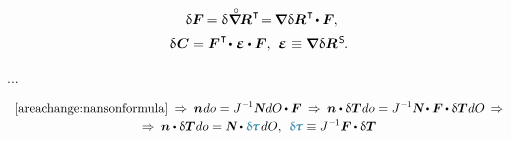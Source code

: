 \begin{otherlanguage}{russian}
\begin{equation}
\begin{array}{c}
\:\,
\variation{\bm{F}} \hspace{-0.2ex} = \variation{\hspace{.1ex} \boldnablacircled \hspace{-0.16ex} \bm{R}^{\hspace{0.12ex}\T}} \hspace{-0.4ex}
= \hspace{-0.2ex} \boldnabla \hspace{.1ex} \variation{\bm{R}}^{\hspace{0.12ex}\T} \hspace{-0.25ex} \dotp \bm{F}
\hspace{-0.1ex} ,
\\[.5em]
%
\variation{\hspace{.12ex}\bm{C}} = \bm{F}^{\hspace{.1ex}\T} \hspace{-0.32ex} \dotp \hspace{.1ex} \mathboldepsilon \dotp \bm{F} ,
\:\,
\mathboldepsilon \hspace{0.1ex} \equiv \boldnabla \hspace{.1ex} \variation{\bm{R}}^{\hspace{0.2ex}\mathsf{S}} \hspace{-0.2ex} .
\end{array}
\end{equation}

...

\begin{equation*}\begin{array}{c}
\eqref{areachange:nansonformula}
\:\Rightarrow\:
%
\bm{n} \hspace{.1ex} do = J^{\hspace{.12ex}\expminusone} \mathboldN \hspace{.1ex} dO \hspace{-0.1ex} \dotp \bm{F}
\:\Rightarrow\:
%
\bm{n} \dotp \variation{\firstpiolakirchhoffstress} \hspace{.1ex} do
= J^{\hspace{.12ex}\expminusone} \mathboldN \hspace{-0.1ex} \dotp \bm{F} \hspace{-0.1ex} \dotp \variation{\firstpiolakirchhoffstress} \hspace{.1ex} dO
\,\Rightarrow
\\[.2em]
%
\Rightarrow\:
\bm{n} \dotp \variation{\firstpiolakirchhoffstress} \hspace{.1ex} do
= \mathboldN \dotp \varbivalent{\hspace{-0.2ex}\cauchystress} \hspace{.25ex} dO ,
\:\:
\varbivalent{\hspace{-0.2ex}\cauchystress} \equiv J^{\hspace{.12ex}\expminusone} \bm{F} \hspace{-0.1ex} \dotp \variation{\firstpiolakirchhoffstress}
\end{array}\end{equation*}


\end{otherlanguage}
